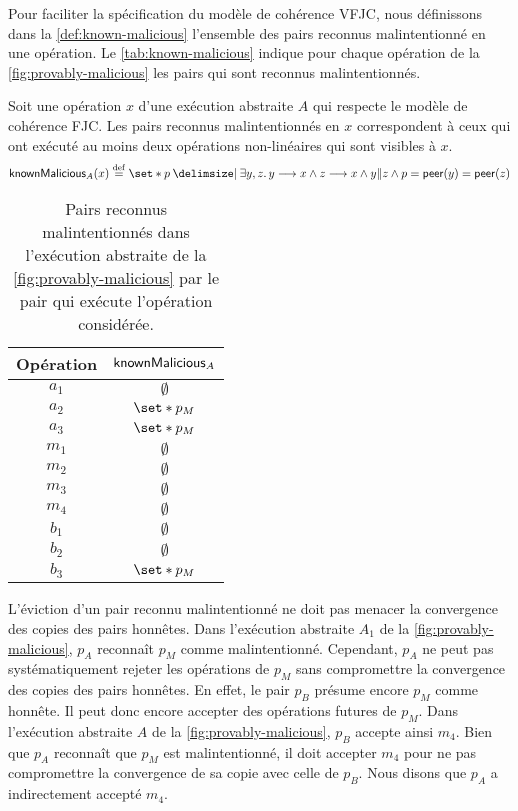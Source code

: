 Pour faciliter la spécification du modèle de cohérence \ac{VFJC}, nous définissons dans la \autoref{def:known-malicious} l'ensemble des pairs reconnus malintentionné en une opération.
Le \autoref{tab:known-malicious} indique pour chaque opération de la \autoref{fig:provably-malicious} les pairs qui sont reconnus malintentionnés.

\begin{definition}\label{def:known-malicious}
  Soit une opération $x$ d'une exécution abstraite $A$ qui respecte le modèle de cohérence \acl{FJC}.
  Les pairs reconnus malintentionnés en $x$ correspondent à ceux qui ont exécuté au moins deux opérations non-linéaires qui sont visibles à $x$.
  \begin{equation*}
      \trm{knownMalicious}_A(x) \defeq \set*{p \given \exists y, z \qsep y \pre x \land z \pre x \land y \concur z \land p = \trm{peer}(y) = \trm{peer}(z)}
  \end{equation*}
\end{definition}

\begin{table}[htb]
    \centering
    \begin{tabular}{cc}
        Opération & $\operatorname{\mathsf{knownMalicious}}_A$ \\
        \toprule
        $a_1$ & $\emptyset$ \\
        $a_2$ & $\set*{p_M}$ \\
        $a_3$ & $\set*{p_M}$ \\
        $m_1$ & $\emptyset$ \\
        $m_2$ & $\emptyset$ \\
        $m_3$ & $\emptyset$ \\
        $m_4$ & $\emptyset$ \\
        $b_1$ & $\emptyset$ \\
        $b_2$ & $\emptyset$ \\
        $b_3$ & $\set*{p_M}$ \\
    \end{tabular}
    \caption{Pairs reconnus malintentionnés dans l'exécution abstraite de la \autoref{fig:provably-malicious} par le pair qui exécute l'opération considérée.}\label{tab:known-malicious}
\end{table}

L'éviction d'un pair reconnu malintentionné ne doit pas menacer la convergence des copies des pairs honnêtes.
Dans l'exécution abstraite $A_1$ de la \autoref{fig:provably-malicious}, $p_A$ reconnaît $p_M$ comme malintentionné.
Cependant, $p_A$ ne peut pas systématiquement rejeter les opérations de $p_M$ sans compromettre la convergence des copies des pairs honnêtes.
En effet, le pair $p_B$ présume encore $p_M$ comme honnête.
Il peut donc encore accepter des opérations futures de $p_M$.
Dans l'exécution abstraite $A$ de la \autoref{fig:provably-malicious}, $p_B$ accepte ainsi $m_4$.
Bien que $p_A$ reconnaît que $p_M$ est malintentionné, il doit accepter $m_4$ pour ne pas compromettre la convergence de sa copie avec celle de $p_B$.
Nous disons que $p_A$ a indirectement accepté $m_4$.


